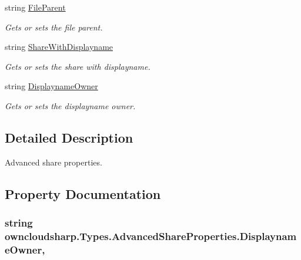 \begin{DoxyCompactItemize}
string \hyperlink{classowncloudsharp_1_1_types_1_1_advanced_share_properties_a2c4e5bdae35155b9bce9f0aa02ca0de2}{File\+Parent}
\begin{DoxyCompactList}\small\item\em Gets or sets the file parent. \end{DoxyCompactList}\item 
string \hyperlink{classowncloudsharp_1_1_types_1_1_advanced_share_properties_a4fdad7e38248634f5ccb65f0afcd7908}{Share\+With\+Displayname}
\begin{DoxyCompactList}\small\item\em Gets or sets the share with displayname. \end{DoxyCompactList}\item 
string \hyperlink{classowncloudsharp_1_1_types_1_1_advanced_share_properties_add275aead35226f84b36e447e4104f0d}{Displayname\+Owner}
\begin{DoxyCompactList}\small\item\em Gets or sets the displayname owner. \end{DoxyCompactList}\end{DoxyCompactItemize}


\subsection{Detailed Description}
Advanced share properties. 



\subsection{Property Documentation}
\hypertarget{classowncloudsharp_1_1_types_1_1_advanced_share_properties_add275aead35226f84b36e447e4104f0d}{}
\subsubsection[{Displayname\+Owner}]{\setlength{\rightskip}{0pt plus 5cm}string owncloudsharp.\+Types.\+Advanced\+Share\+Properties.\+Displayname\+Owner\hspace{0.3cm}{\ttfamily [get]}, {\ttfamily [set]}}\label{classowncloudsharp_1_1_types_1_1_advanced_share_properties_add275aead35226f84b36e447e4104f0d}


